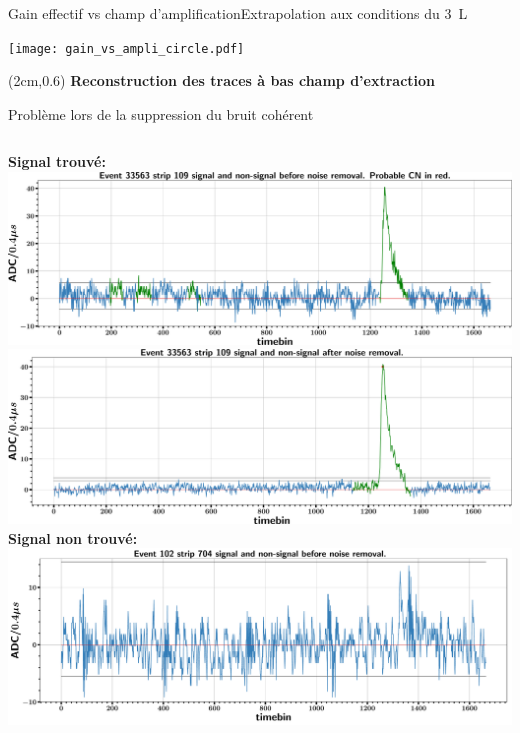     \begin{frame}{Gain effectif vs champ d'amplification}{Extrapolation aux conditions du \SI{3}{\liter}}
        \begin{Large}
            {\centering\vspace{0.42cm}\texttt{[image: gain\_vs\_ampli\_circle.pdf]}}
            \begin{textblock*}{\textwidth}(2cm,0.6\textheight)
                \centering \textbf{Reconstruction des traces à bas champ d'extraction}
            \end{textblock*}
        \end{Large}
    \end{frame}
    
    \begin{frame}{Problème lors de la suppression du bruit cohérent}
        \begin{scriptsize}
            \begin{columns}
                \begin{column}{0.45\textwidth}
                    \centering \textbf{Signal trouvé:}\\
                    \centering \includegraphics[width=\textwidth]{./pictures/good_pedsub.png}\\
                    \centering \includegraphics[width=\textwidth]{./pictures/good_cnsub.png}\\
                    \centering \textbf{Signal non trouvé:}\\
                    \centering \includegraphics[width=\textwidth]{./pictures/pedsub_adcs_high_threshold.pdf}\\

\end{column}
\end{columns}
\end{scriptsize}
\end{frame}
